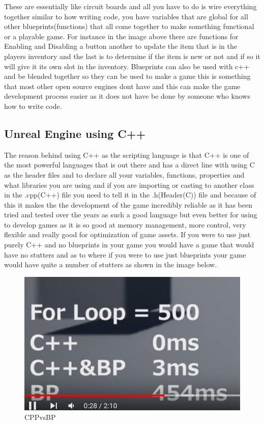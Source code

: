 These are essentially like circuit boards and all you have to do is wire everything together similar to how writing code, you have variables that are global for all other blueprints(functions) that all come together to make something functional or a playable game. For instance in the image above there are functions for Enabling and Disabling a button another to update the item that is in the players inventory and the last is to determine if the item is new or not and if so it will give it its own slot in the inventory. Blueprints can also be used with c++ and be blended together so they can be used to make a game this is something that most other open source engines dont have and this can make the game development process easier as it does not have be done by someone who knows how to write code.
\subsection{Unreal Engine using C++}
The reason behind using C++ as the scripting language is that C++ is one of the most powerful languages that is out there and has a direct line with using C as the header files and to declare all your variables, functions, properties and what libraries you are using and if you are importing or casting to another class in the .cpp(C++) file you need to tell it in the .h(Header(C)) file and because of this it makes the the development of the game incredibly reliable as it has been tried and tested over the years as such a good language but even better for using to develop games as it is so good at memory management, more control, very flexible and really good for optimization of game assets. If you were to use just purely C++ and no blueprints in your game you would have a game that would have no stutters and as to where if you were to use just blueprints your game would have quite a number of stutters as shown in the image below.
\begin{figure}[H]
    \centering
    \includegraphics[scale=.6]{img/CPPvsBP.PNG}
    \caption{CPPvsBP}
    \label{Unreal Blueprints}
\end{figure}
